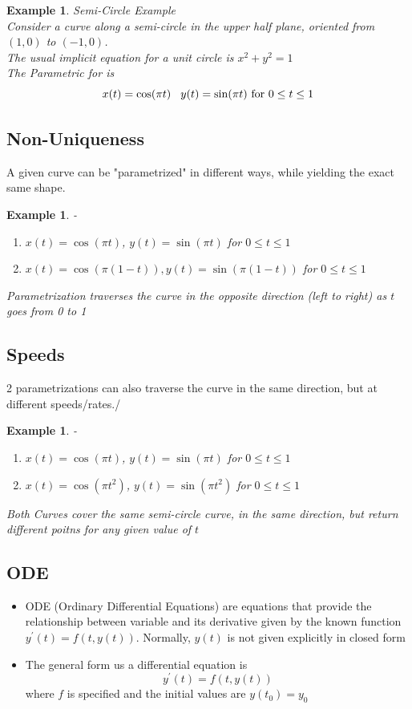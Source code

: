\documentclass[twoside]{article}
\newtheorem{ex}[theorem]{Example}
\begin{document}
\begin{ex} Semi-Circle Example \\
Consider a curve along a semi-circle in the upper half plane, oriented from \((1,0)\) to \((-1,0)\).\\
The usual implicit equation for a unit circle is \(x^2 + y^2 = 1\)\\

The Parametric for is 
$$ x(t) = \cos (\pi t) \\ \hspace{0.3cm} y(t) = \sin(\pi t) \text{ for } 0 \leq t \leq 1$$
\end{ex}

\subsection{Non-Uniqueness}
A given curve can be "parametrized" in different ways, while yielding the exact same shape.

\begin{ex}-\\
\begin{enumerate}
\item \(x(t) = \cos (\pi t)\), \(y(t) = \sin(\pi t)\) for \(0 \leq t \leq 1\)
\item \(x(t) = \cos(\pi ( 1 - t)), y(t) = \sin(\pi (1 - t)) \) for \(0 \leq t \leq 1\)
\end{enumerate}
Parametrization traverses the curve in the opposite direction (left to right) as \(t\) goes from 0 to 1
\end{ex}


\subsection{Speeds}
2 parametrizations can also traverse the curve in the same direction, but at different speeds/rates./ \begin{ex}-
\begin{enumerate}
\item \(x(t) = \cos (\pi t)\), \(y(t) = \sin(\pi t)\) for \(0 \leq t \leq 1\)
\item \(x(t) = \cos (\pi t^2)\), \(y(t) = \sin(\pi t^2)\) for \(0 \leq t \leq 1\)
\end{enumerate} 
Both Curves cover the same semi-circle curve, in the same direction, but return different poitns for any given value of \(t\) 
\end{ex}

\subsection{ODE}
\begin{itemize}
\item ODE (Ordinary Differential Equations) are equations that provide the relationship between variable and its derivative given by the known function \(y^\prime (t) = f(t, y(t))\). Normally, \(y(t)\) is not given explicitly in closed form
\item The general form us a differential equation is 
$$y^\prime (t) = f(t, y(t))$$
where \(f\) is specified and the initial values are 
\(y(t_0) = y_0\)
\end{itemize}
\end{document}
